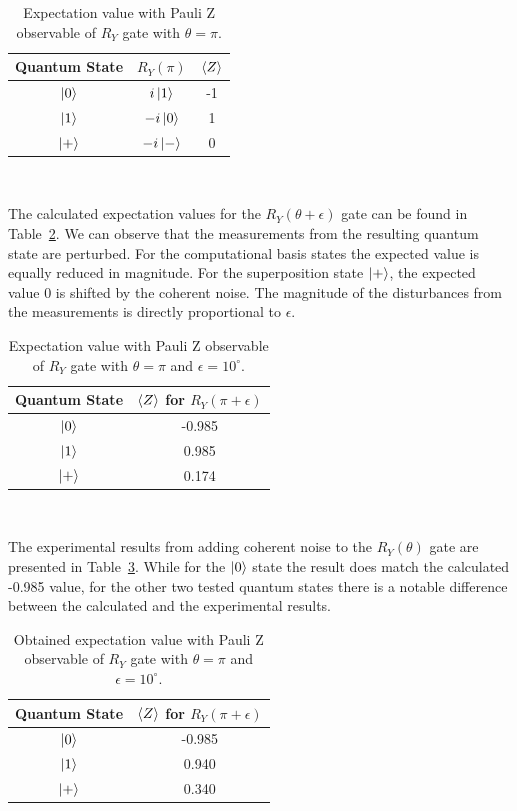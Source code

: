 \begin{table}[h]
  \centering
  \begin{tabular}{|c|c|c|}
    \hline
    Quantum State & \(R_{Y}\left(\pi\right)\) & \(\expval{Z}\) \\
    \hline
    \(\ket{0}\) & \(i\ket{1}\) & -1 \\
    \hline
    \(\ket{1}\) & \(-i\ket{0}\) & 1 \\
    \hline
    \(\ket{+}\) & \(-i\ket{-}\) & 0 \\
    \hline
  \end{tabular}
  \caption{Expectation value with Pauli Z observable of \(R_{Y}\) gate with \(\theta = \pi\).}\label{tab:ry_ideal}
\end{table} \

The calculated expectation values for the \(R_{Y}(\theta + \epsilon)\) gate
can be found in Table~\ref{tab:ry_iso_noise}. We can observe that the
measurements from the resulting quantum state are perturbed. For the
computational basis states the expected value is equally reduced in magnitude.
For the superposition state \(\ket{+}\), the expected value 0 is shifted
by the coherent noise. The magnitude of the disturbances from the
measurements is directly proportional to \(\epsilon\). \

\begin{table}[h]
  \centering
  \begin{tabular}{|c|c|}
    \hline
    Quantum State & \(\expval{Z}\) for \(R_{Y}\left(\pi+\epsilon\right)\) \\
    \hline
    \(\ket{0}\) & -0.985 \\
    \hline
    \(\ket{1}\) & 0.985 \\
    \hline
    \(\ket{+}\) &  0.174 \\
    \hline
  \end{tabular}
  \caption{Expectation value with Pauli Z observable of \(R_{Y}\) gate with \(\theta = \pi\) and \(\epsilon = 10^{\circ}\).}\label{tab:ry_iso_noise}
\end{table} \

The experimental results from adding coherent noise to the
\(R_{Y}(\theta)\) gate are presented in Table~\ref{tab:ry_real_noise}. 
While for the \(\ket{0}\) state the result does match the calculated
-0.985 value, for the other two tested quantum states there is a
notable difference between the calculated and the experimental results. \

\begin{table}[h]
  \centering
  \begin{tabular}{|c|c|}
    \hline
    Quantum State & \(\expval{Z}\) for \(R_{Y}\left(\pi+\epsilon\right)\) \\
    \hline
    \(\ket{0}\) & -0.985 \\
    \hline
    \(\ket{1}\) & 0.940 \\
    \hline
    \(\ket{+}\) &  0.340 \\
    \hline
  \end{tabular}
  \caption{Obtained expectation value with Pauli Z observable of \(R_{Y}\) gate with \(\theta = \pi\) and \(\epsilon = 10^{\circ}\).}\label{tab:ry_real_noise}
\end{table} \

